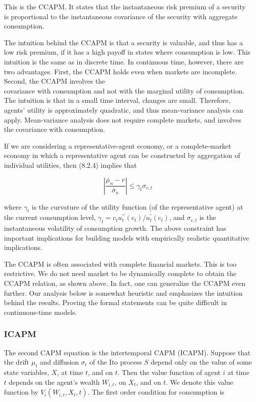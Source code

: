 \documentclass[\topdir/lecture\_notes.tex]{subfiles}
\begin{document}
This is the CCAPM. It states that the instantaneous risk premium of a security is proportional to the instantaneous covariance of the security with aggregate consumption.

The intuition behind the CCAPM is that a security is valuable, and thus has a low risk premium, if it has a high payoff in states where consumption is low. This intuition is the same as in discrete time. In continuous time, however, there are two advantages. First, the CCAPM holds even when markets are incomplete. Second, the CCAPM involves the\\
covariance with consumption and not with the marginal utility of consumption. The intuition is that in a small time interval, changes are small. Therefore, agents' utility is approximately quadratic, and thus mean-variance analysis can apply. Mean-variance analysis does not require complete markets, and involves the covariance with consumption.

If we are considering a representative-agent economy, or a complete-market economy in which a representative agent can be constructed by aggregation of individual utilities, then (8.2.4) implies that

\begin{equation}
\left|\frac{\bar{\mu}_{n}-r}{\bar{\sigma}_{n}}\right| \leq \gamma_{t} \sigma_{c, t}
\end{equation}

where \(\gamma_{t}\) is the curvature of the utility function (of the representative agent) at the current consumption level, \(\gamma_{t}=c_{t} u_{t}^{\prime \prime}\left(c_{t}\right) / u_{t}^{\prime}\left(c_{t}\right)\), and \(\sigma_{c, t}\) is the instantaneous volatility of consumption growth. The above constraint has important implications for building models with empirically realistic quantitative implications.

The CCAPM is often associated with complete financial markets. This is too restrictive. We do not need market to be dynamically complete to obtain the CCAPM relation, as shown above. In fact, one can generalize the CCAPM even further. Our analysis below is somewhat heuristic and emphasizes the intuition behind the results. Proving the formal statements can be quite difficult in continuous-time models.


\subsubsection{ICAPM}
The second CAPM equation is the intertemporal CAPM (ICAPM). Suppose that the drift \(\mu_{t}\) and diffusion \(\sigma_{t}\) of the Ito process \(S\) depend only on the value of some state variables, \(X\), at time \(t\), and on \(t\). Then the value function of agent \(i\) at time \(t\) depends on the agent's wealth \(W_{i, t}\), on \(X_{t}\), and on \(t\). We denote this value function by \(V_{i}\left(W_{i, t}, X_{t}, t\right)\). The first order condition for consumption is
\end{document}
